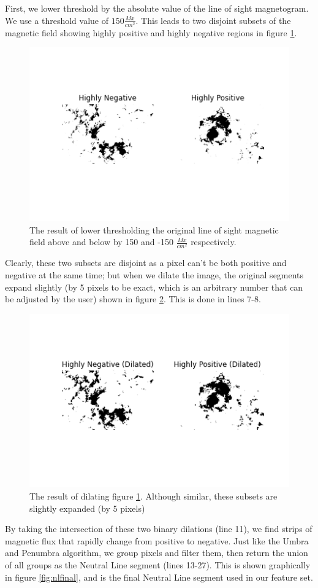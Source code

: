 \documentclass[defaultstyle,11pt]{thesis}
\begin{document}
First, we lower threshold by the absolute value of the line of sight magnetogram. We use a threshold value of $150 \frac{Mx}{cm^2}$. This leads to two disjoint subsets of the magnetic field showing highly positive and highly negative regions in figure \ref{fig:nlposneg}.


\begin{figure}[h]
    \centering
    \includegraphics[width=0.5\linewidth]{ThesisFilePkg/figures/data/posneg.png}
    \caption{The result of lower thresholding the original line of sight magnetic field above and below by 150 and -150 $\frac{Mx}{cm^2}$ respectively.}
    \label{fig:nlposneg}
\end{figure}

Clearly, these two subsets are disjoint as a pixel can't be both positive and negative at the same time; but when we dilate the image, the original segments expand slightly (by 5 pixels to be exact, which is an arbitrary number that can be adjusted by the user) shown in figure \ref{fig:nldilated}. This is done in lines 7-8.

\begin{figure}[h]
    \centering
    \includegraphics[width=0.5\linewidth]{ThesisFilePkg/figures/data/dilated.png}
    \caption{The result of dilating figure \ref{fig:nlposneg}. Although similar, these subsets are slightly expanded (by 5 pixels)}
    \label{fig:nldilated}
\end{figure}

By taking the intersection of these two binary dilations (line 11), we find strips of magnetic flux that rapidly change from positive to negative. Just like the Umbra and Penumbra algorithm, we group pixels and filter them, then return the union of all groups as the Neutral Line segment (lines 13-27). This is shown graphically in figure \ref{fig:nlfinal}, and is the final Neutral Line segment used in our feature set.
\end{document}
